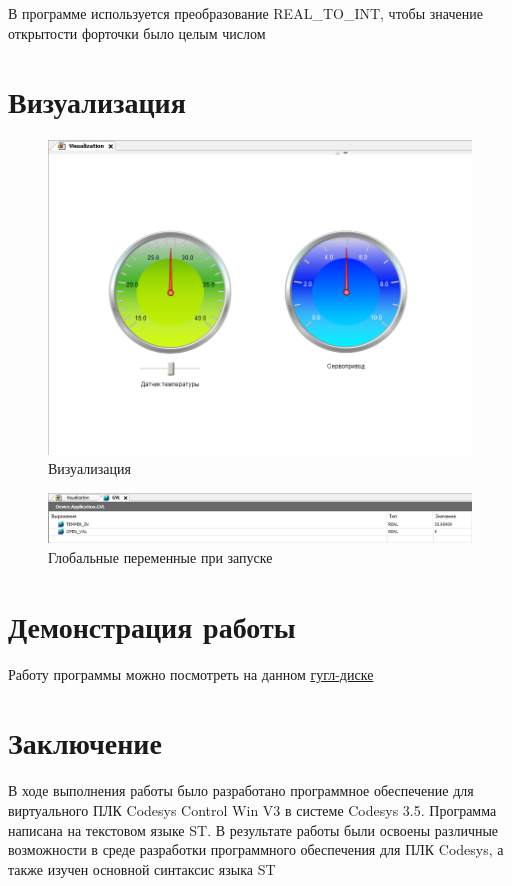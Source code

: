 \documentclass[a4paper, 16pt]{article}
\begin{document}
    \noindent В программе используется преобразование REAL\_{TO}\_{INT}, чтобы значение открытости
    форточки было целым числом


    \newpage
    \section{Визуализация}
    \begin{figure}[!h]
        \centering
        \includegraphics[scale=0.5]{visu.png}
        \captionsetup{skip=0pt}
        \caption{Визуализация}
        \label{Рис:5}
    \end{figure}
    \begin{figure}[!h]
        \centering
        \includegraphics[scale=0.55]{visu2.png}
        \captionsetup{skip=0pt}
        \caption{Глобальные переменные при запуске}
        \label{Рис:6}
    \end{figure}


    \section{Демонстрация работы}
    \noindent Работу программы можно посмотреть на данном \href{https://drive.google.com/drive/folders/1dUwB7bgcupbfOugc56xTzlspjJ7I331R?usp=sharing}{гугл-диске}


    \section{Заключение}
    \noindent В ходе выполнения работы было разработано программное обеспечение для виртуального
    ПЛК Codesys Control Win V3 в системе Codesys 3.5. Программа написана на текстовом языке ST.
    В результате работы были освоены различные возможности в среде разработки программного обеспечения
    для ПЛК Codesys, а также изучен основной синтаксис языка ST
\end{document}
